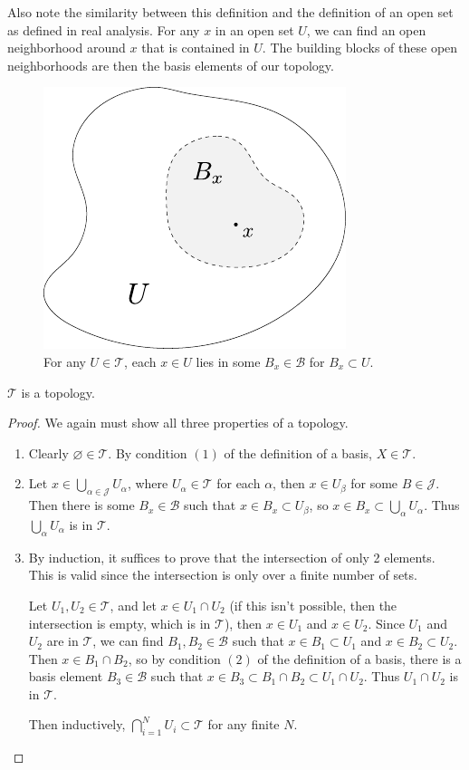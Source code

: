 \documentclass[10pt]{report}
\begin{document}
Also note the similarity between this definition and the definition of an open set as defined in real analysis. For any $x$ in an open set $U$, we can find an open neighborhood around $x$ that is contained in $U$. The building blocks of these open neighborhoods are then the basis elements of our topology.

\begin{figure}[H]
	\centering
	\includegraphics[scale=1]{fig/gen-top.pdf}
	\caption{For any $U \in \mathcal{T}$, each $x \in U$ lies in some $B_x \in \mathcal{B}$ for $B_x \subset U$.}
\end{figure}


\begin{prop}
	$\mathcal{T}$ is a topology.
\end{prop}
\begin{proof}
	We again must show all three properties of a topology.
	\begin{enumerate}
		\item Clearly $\varnothing \in \mathcal{T}$. By condition $(1)$ of the definition of a basis, $X \in \mathcal{T}$.
		\item Let $x \in \bigcup_{\alpha\in\mathcal{J}} U_\alpha$, where $U_\alpha \in \mathcal{T}$ for each $\alpha$, then $x \in U_\beta$ for some $B \in \mathcal{J}$. Then there is some $B_x \in \mathcal{B}$ such that $x \in B_x \subset U_\beta$, so $x \in B_x \subset \bigcup_{\alpha}U_\alpha$. Thus $\bigcup_{\alpha}U_\alpha$ is in $\mathcal{T}$.
		\item By induction, it suffices to prove that the intersection of only 2 elements. This is valid since the intersection is only over a finite number of sets.

			Let $U_1,U_2 \in \mathcal{T}$, and let $x \in U_1 \cap U_2$ (if this isn't possible, then the intersection is empty, which is in $\mathcal{T}$), then $x \in U_1$ and $x \in U_2$. Since $U_1$ and $U_2$ are in $\mathcal{T}$, we can find $B_1,B_2 \in \mathcal{B}$ such that $x \in B_1 \subset U_1$ and $x \in B_2 \subset U_2$. Then $x \in B_1 \cap B_2$, so by condition $(2)$ of the definition of a basis, there is a basis element $B_3 \in \mathcal{B}$ such that $x \in B_3 \subset B_1 \cap B_2 \subset U_1 \cap U_2$. Thus $U_1 \cap U_2$ is in $\mathcal{T}$.

			Then inductively, $\bigcap_{i=1}^N U_i \subset \mathcal{T}$ for any finite $N$.
	\end{enumerate}
\end{proof}
\end{document}
